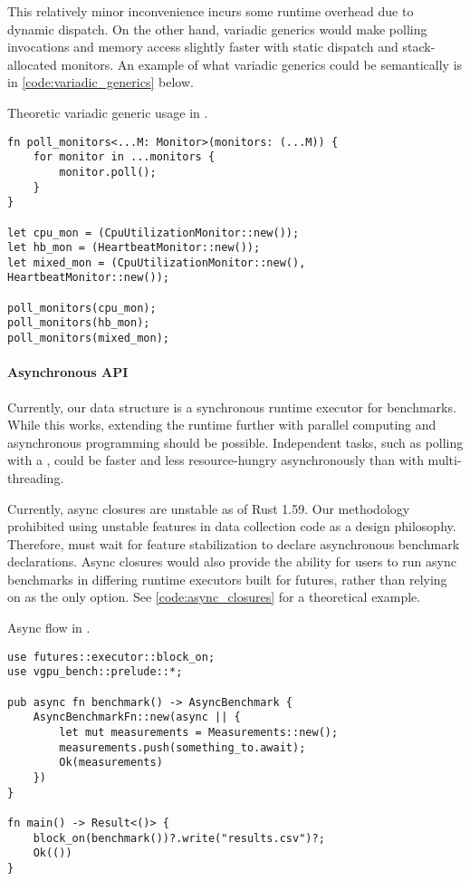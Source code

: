 This relatively minor inconvenience incurs some runtime overhead due to dynamic dispatch. On the other hand, variadic generics would make polling invocations and memory access slightly faster with static dispatch and stack-allocated monitors. An example of what variadic generics could be semantically is in \cref{code:variadic_generics} below.

\begin{snippet}
\caption{Theoretic variadic generic usage in \toollinkedname.}\label{code:variadic_generics}
\begin{verbatim}
fn poll_monitors<...M: Monitor>(monitors: (...M)) {
    for monitor in ...monitors {
        monitor.poll();
    }
}

let cpu_mon = (CpuUtilizationMonitor::new());
let hb_mon = (HeartbeatMonitor::new());
let mixed_mon = (CpuUtilizationMonitor::new(), HeartbeatMonitor::new());

poll_monitors(cpu_mon);
poll_monitors(hb_mon);
poll_monitors(mixed_mon);
\end{verbatim}
\end{snippet}
\medskip

\paragraph{Asynchronous API}
Currently, our  data structure is a synchronous runtime executor for benchmarks. While this works, extending the runtime further with parallel computing and asynchronous programming should be possible. Independent tasks, such as polling with a , could be faster and less resource-hungry asynchronously than with multi-threading.\medskip

Currently, async closures are unstable as of Rust 1.59. Our methodology prohibited using unstable features in data collection code as a design philosophy. Therefore, \toollinkedname must wait for feature stabilization to declare asynchronous benchmark declarations. Async closures would also provide the ability for users to run async benchmarks in differing runtime executors built for futures, rather than relying on  as the only option. See \cref{code:async_closures} for a theoretical example.

\begin{snippet}
\caption{Async flow in \toollinkedname.}\label{code:async_closures}
\begin{verbatim}
use futures::executor::block_on;
use vgpu_bench::prelude::*;

pub async fn benchmark() -> AsyncBenchmark {
    AsyncBenchmarkFn::new(async || {
        let mut measurements = Measurements::new();
        measurements.push(something_to.await);
        Ok(measurements)
    })
}

fn main() -> Result<()> {
    block_on(benchmark())?.write("results.csv")?;
    Ok(())
}
\end{verbatim}
\end{snippet}